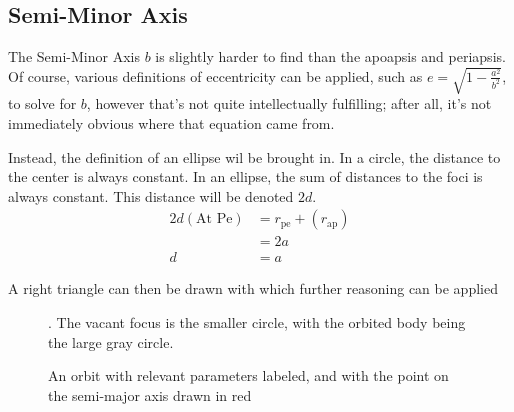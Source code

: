 \documentclass[../main.tex]{subfiles}
\begin{document}
\subsection{Semi-Minor Axis}\label{Sec:Semi Minor Axis Geometric}

The Semi-Minor Axis $b$ is slightly harder to find than the apoapsis and periapsis. Of course, various definitions of eccentricity can be applied, such as $e=\sqrt{1-\frac{a^2}{b^2}}$, to solve for $b$, however that's not quite intellectually fulfilling; after all, it's not immediately obvious where that equation came from.

Instead, the definition of an ellipse wil be brought in. In a circle, the distance to the center is always constant. In an ellipse, the sum of distances to the foci is always constant. This distance will be denoted $2d$.
\begin{align*}
    2d(\text{At Pe}) & = r_\text{pe}+(r_\text{ap}) \\
                     & = 2a                        \\
    d                & =a
\end{align*}

A right triangle can then be drawn with which further reasoning can be applied
\begin{figure}[H]
    \centering

    \caption{An orbit with relevant parameters labeled, and with the point on the semi-major axis drawn in red}. The vacant focus is the smaller circle, with the orbited body being the large gray circle.
\end{figure}
\end{document}
